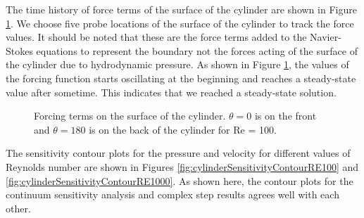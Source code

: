 \documentclass[12pt]{aiaa-pretty}
\begin{document}
The time history of force terms of the surface of the cylinder are shown in Figure \ref{fig:cylinderForceTerms}. We choose five probe locations of the surface of the cylinder to track the force values. It should be noted that these are the force terms added to the Navier-Stokes equations to represent the boundary not the forces acting of the surface of the cylinder due to hydrodynamic pressure. As shown in Figure \ref{fig:cylinderForceTerms}, the values of the forcing function starts oscillating at the beginning and reaches a steady-state value after sometime. This indicates that we reached a steady-state solution.

%
\begin{figure}[H]
	\centering
	\quad
	\caption{Forcing terms on the surface of the cylinder. $\theta = 0$ is on the front and $\theta = 180$ is on the back of the cylinder for Re = 100.}
	\label{fig:cylinderForceTerms}
\end{figure}
%

The sensitivity contour plots for the pressure and velocity for different values of Reynolds number are shown in Figures \ref{fig:cylinderSensitivityContourRE100} and \ref{fig:cylinderSensitivityContourRE1000}. As shown here, the contour plots for the continuum sensitivity analysis and complex step results agrees well with each other.
\end{document}

